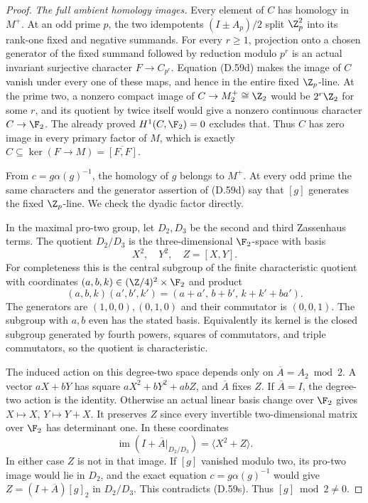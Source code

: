 \begin{proof}
\emph{The full ambient homology images.}
Every element of $C$ has homology in $M^+$.
At an odd prime $p$, the two idempotents
$(I\pm A_p)/2$ split $\Z_p^2$ into its rank-one
fixed and negative summands.
For every $r\geq1$, projection onto a chosen
generator of the fixed summand followed by
reduction modulo $p^r$ is an actual invariant
surjective character $F\to C_{p^r}$.
Equation (D.59d) makes the image of $C$ vanish
under every one of these maps, and hence in the
entire fixed $\Z_p$-line.
At the prime two, a nonzero compact image of
$C\to M^+_2\cong\Z_2$ would be $2^r\Z_2$ for
some $r$, and its quotient by twice itself would
give a nonzero continuous character $C\to\F_2$.
The already proved $H^1(C,\F_2)=0$ excludes that.
Thus $C$ has zero image in every primary factor
of $M$, which is exactly
$C\subseteq\ker(F\to M)=\overline{[F,F]}$.

From $c=g\alpha(g)^{-1}$, the homology of $g$
belongs to $M^+$. At every odd prime the same
characters and the generator assertion of
(D.59d) say that $[g]$ generates the fixed
$\Z_p$-line. We check the dyadic factor directly.

In the maximal pro-two group, let $D_2,D_3$
be the second and third Zassenhaus terms.
The quotient $D_2/D_3$ is the three-dimensional
$\F_2$-space with basis
\[
                        X^2,\quad Y^2,\quad Z=[X,Y].
\]
For completeness this is the central subgroup of
the finite characteristic quotient with
coordinates $(a,b,k)\in(\Z/4)^2\times\F_2$ and
product
\[
 (a,b,k)(a',b',k')
     =(a+a',\,b+b',\,k+k'+ba').
                                                        \tag{D.59r}
\]
The generators are $(1,0,0),(0,1,0)$ and
their commutator is $(0,0,1)$.
The subgroup with $a,b$ even has the stated basis.
Equivalently its kernel is the closed subgroup
generated by fourth powers, squares of commutators,
and triple commutators, so the quotient is
characteristic.

The induced action on this degree-two space depends
only on $\overline A=A_2\bmod2$. A vector
$aX+bY$ has square
$aX^2+bY^2+abZ$, and $\overline A$ fixes $Z$.
If $\overline A=I$, the degree-two action is
the identity. Otherwise an actual linear basis
change over $\F_2$ gives
$X\mapsto X$, $Y\mapsto Y+X$.
It preserves $Z$ since every invertible
two-dimensional matrix over $\F_2$ has determinant
one. In these coordinates
\[
 \operatorname{im}(I+\overline A|_{D_2/D_3})
                        =\langle X^2+Z\rangle .
                                                        \tag{D.59s}
\]
In either case $Z$ is not in that image.
If $[g]$ vanished modulo two, its pro-two image
would lie in $D_2$, and the exact equation
$c=g\alpha(g)^{-1}$ would give
$Z=(I+\overline A)[g]_2$ in $D_2/D_3$.
This contradicts (D.59s).
Thus $[g]\bmod2\ne0$.


\end{proof}
